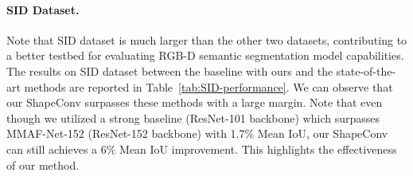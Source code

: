 \begin{table}[h!]
\centering


\vspace{-0.2cm}
\caption{
\label{tab:SUN-RGBD performance}
Performance comparison on SUN-RGBD dataset.}
\end{table} 


\vspace{-0.7cm}
\paragraph{SID Dataset.}
Note that SID dataset is much larger than the other two datasets, contributing to a better testbed for evaluating RGB-D semantic segmentation model capabilities. The results on SID dataset between the baseline with ours and the state-of-the-art methods are reported in Table~\ref{tab:SID-performance}. We can observe that our ShapeConv surpasses these methods with a large margin. Note that even though we utilized a strong baseline (ResNet-101 backbone) which surpasses MMAF-Net-152 (ResNet-152 backbone) with 1.7\% Mean IoU, our ShapeConv can still achieves a 6\% Mean IoU improvement. This highlights the effectiveness of our method.


